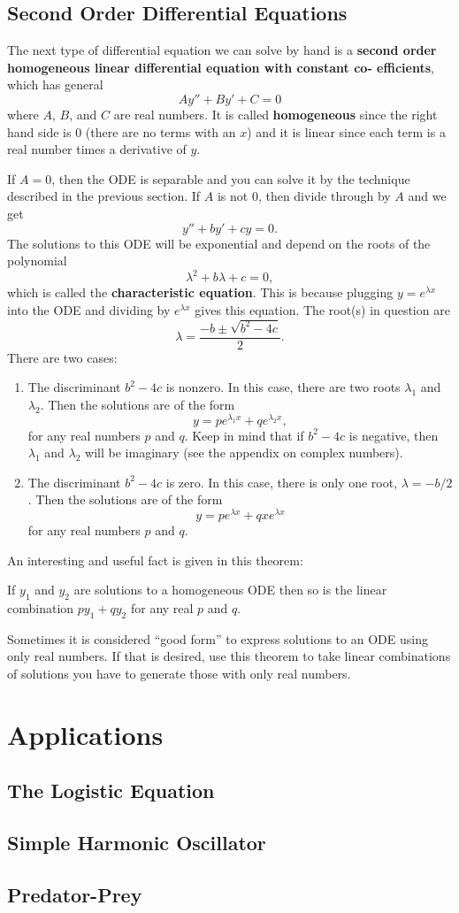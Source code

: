 \subsection{Second Order Differential Equations}

The next type of differential equation we can solve by hand is a \textbf{second order homogeneous linear differential equation with constant co-
efficients}, which has general
$$Ay''+By'+C=0$$
where $A$, $B$, and $C$ are real numbers. It is called \textbf{homogeneous} since the right hand side is 0 (there are no terms with an $x$) and it is linear since each term is a real number times a derivative of $y$. 

If $A=0$, then the ODE is separable and you can solve it by the technique described in the previous section. If $A$ is not 0, then divide through by $A$ and we get
$$y''+by'+cy=0.$$
The solutions to this ODE will be exponential and depend on the roots of the polynomial
$$\lambda^2 + b\lambda + c = 0,$$
which is called the \textbf{characteristic equation}.
This is because plugging $y=e^{\lambda x}$ into the ODE and dividing by $e^{\lambda x}$ gives this equation.  The root(s) in question are
$$\lambda = \frac{-b \pm \sqrt{b^2-4c}}{2}.$$
 There are two cases:
\begin{enumerate}
\item The discriminant $b^2-4c$ is nonzero. In this case, there are two roots $\lambda_1$ and $\lambda_2$. Then the solutions are of the form
$$y=pe^{\lambda_1 x} + qe^{\lambda_2 x},$$
for any real numbers $p$ and $q$. Keep in mind that if $b^2-4c$ is negative, then $\lambda_1$ and $\lambda_2$ will be imaginary (see the appendix on complex numbers). 
\item The discriminant $b^2-4c$ is zero. In this case, there is only one root, $\lambda = -b/2$. Then the solutions are of the form
$$y=pe^{\lambda x}+qxe^{\lambda x}$$
for any real numbers $p$ and $q$.
\end{enumerate}

An interesting and useful fact is given in this theorem:
\begin{thm}
If $y_1$ and $y_2$ are solutions to a homogeneous ODE then so is the linear combination $p{y_1}+q{y_2}$ for any real $p$ and $q$.
\end{thm}
 
Sometimes it is considered ``good form'' to express solutions to an ODE using only real numbers. If that is desired, use this theorem to take linear combinations of solutions you have to generate those with only real numbers.

\section{Applications}
\subsection{The Logistic Equation}
\subsection{Simple Harmonic Oscillator}
\subsection{Predator-Prey}
